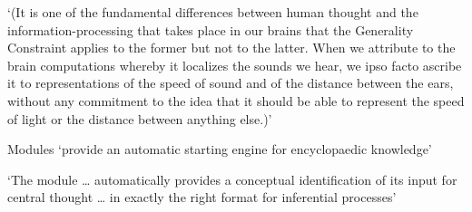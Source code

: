 \documentclass[12pt]{extarticle}
\begin{document}
\begin{multicols}{3}
‘(It is one of the fundamental differences between human thought and the information-processing that takes place in our brains that the Generality Constraint applies to the former but not to the latter. When we attribute to the brain computations whereby it localizes the sounds we hear, we ipso facto ascribe it to representations of the speed of sound and of the distance between the ears, without any commitment to the idea that it should be able to represent the speed of light or the distance between anything else.)’
\citep[p.\ 104, footnote 22]{Evans:1982je}
 
Modules ‘provide an automatic starting engine for encyclopaedic knowledge’
\citep[p.\ 194]{Leslie:1988ct}
 
‘The module … automatically provides a conceptual identification of its input for central thought … in exactly the right format for inferential processes’
\citep[p.\ 193--4]{Leslie:1988ct}
 


 
\footnotesize 


\end{multicols}
\end{document}
